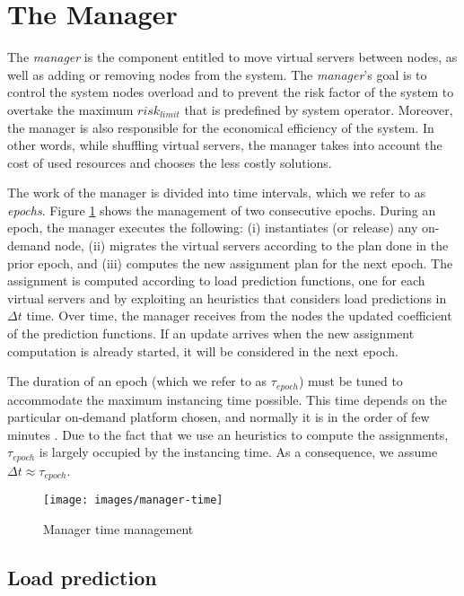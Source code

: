 \documentclass[final,10pt,a5paper]{phdimt}
\theoremstyle{definition}
\begin{document}
\section{The Manager}
\label{sec:balancer}


The \textit{manager} is the component entitled to move virtual servers between nodes, as well as adding or removing nodes from the system.
The \textit{manager}'s goal is to control the system nodes overload and to prevent the risk factor of the system to overtake the maximum $risk_{limit}$ that is predefined by system operator. Moreover, the manager is also responsible for the economical efficiency of the system. In other words, while shuffling virtual servers, the manager takes into account the cost of used resources and chooses the less costly solutions. 

The work of the manager is divided into time intervals, which we refer to as \textit{epochs}.
Figure \ref{fig:loop} shows the management of two consecutive epochs.
During an epoch, the manager executes the following: (i) instantiates (or release) any on-demand node, (ii) migrates the virtual servers according to the plan done in the prior epoch, and (iii) computes the new assignment plan for the next epoch. 
The assignment is computed according to load prediction functions, one for each virtual servers and by exploiting an heuristics that considers load predictions in $\Delta t$ time. 
Over time, the manager receives from the nodes the updated coefficient of the prediction functions.
If an update arrives when the new assignment computation is already started, it will be considered in the next epoch.


The duration of an epoch (which we refer to as $\tau_{epoch}$) must be tuned to accommodate the maximum instancing time possible.
This time depends on the particular on-demand platform chosen, and normally it is in the order of few minutes \cite{markatchev2009cloud}. 
 Due to the fact that we use an heuristics to compute the assignments, $\tau_{epoch}$ is largely occupied by the instancing time. As a consequence, we assume $\Delta t \approx \tau_{epoch}$.


\begin{figure}
  \centering
  \texttt{[image: images/manager-time]}                
  \caption{Manager time management}
  \label{fig:loop}
\end{figure}

\subsection{Load prediction}
\end{document}
